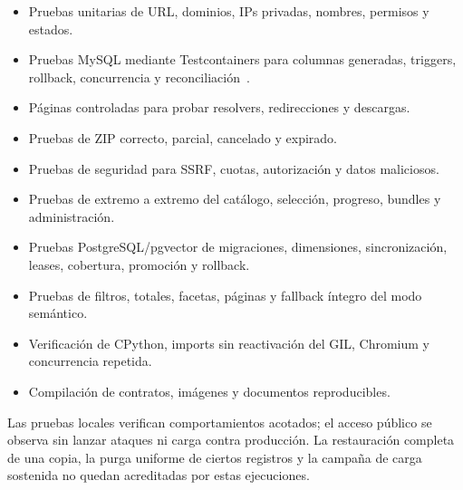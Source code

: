 \begin{itemize}
	\item Pruebas unitarias de URL, dominios, IPs privadas, nombres, permisos y estados.
	\item Pruebas MySQL mediante Testcontainers para columnas generadas, triggers, rollback, concurrencia y reconciliación~\cite{testcontainers}.
	\item Páginas controladas para probar resolvers, redirecciones y descargas.
	\item Pruebas de ZIP correcto, parcial, cancelado y expirado.
	\item Pruebas de seguridad para SSRF, cuotas, autorización y datos maliciosos.
	\item Pruebas de extremo a extremo del catálogo, selección, progreso, bundles y administración.
	\item Pruebas PostgreSQL/pgvector de migraciones, dimensiones, sincronización, leases, cobertura, promoción y rollback.
	\item Pruebas de filtros, totales, facetas, páginas y fallback íntegro del modo semántico.
	\item Verificación de CPython, imports sin reactivación del GIL, Chromium y concurrencia repetida.
	\item Compilación de contratos, imágenes y documentos reproducibles.
\end{itemize}

Las pruebas locales verifican comportamientos acotados; el acceso público se observa sin lanzar ataques ni carga contra producción. La restauración completa de una copia, la purga uniforme de ciertos registros y la campaña de carga sostenida no quedan acreditadas por estas ejecuciones.
